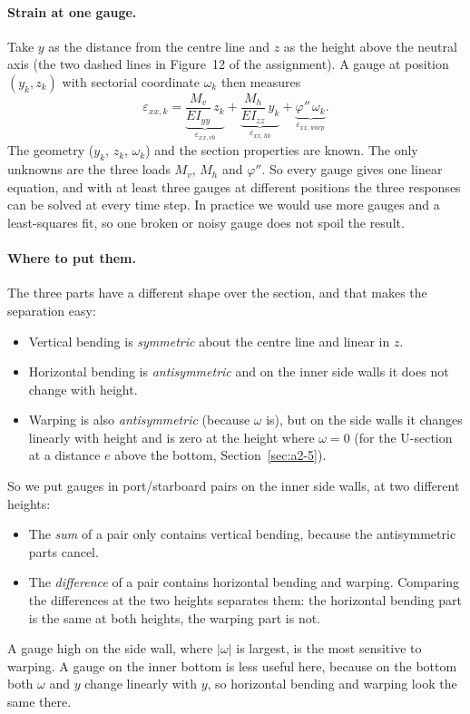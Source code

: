 \paragraph{Strain at one gauge.} Take $y$ as the distance from the centre line and $z$ as the height above the neutral axis (the two dashed lines in Figure~12 of the assignment). A gauge at position $(y_k, z_k)$ with sectorial coordinate $\omega_k$ then measures
\begin{equation}
  \varepsilon_{xx,k}
  = \underbrace{\frac{M_v}{E I_{yy}}\,z_k}_{\varepsilon_{xx,vb}}
  + \underbrace{\frac{M_h}{E I_{zz}}\,y_k}_{\varepsilon_{xx,hb}}
  + \underbrace{\varphi''\,\omega_k}_{\varepsilon_{xx,warp}} .
  \label{eq:a7-strain}
\end{equation}
The geometry ($y_k$, $z_k$, $\omega_k$) and the section properties are known. The only unknowns are the three loads $M_v$, $M_h$ and $\varphi''$. So every gauge gives one linear equation, and with at least three gauges at different positions the three responses can be solved at every time step. In practice we would use more gauges and a least-squares fit, so one broken or noisy gauge does not spoil the result.

\paragraph{Where to put them.} The three parts have a different shape over the section, and that makes the separation easy:
\begin{itemize}
  \item Vertical bending is \emph{symmetric} about the centre line and linear in $z$.
  \item Horizontal bending is \emph{antisymmetric} and on the inner side walls it does not change with height.
  \item Warping is also \emph{antisymmetric} (because $\omega$ is), but on the side walls it changes linearly with height and is zero at the height where $\omega = 0$ (for the U-section at a distance $e$ above the bottom, Section~\ref{sec:a2-5}).
\end{itemize}
So we put gauges in port/starboard pairs on the inner side walls, at two different heights:
\begin{itemize}
  \item The \emph{sum} of a pair only contains vertical bending, because the antisymmetric parts cancel.
  \item The \emph{difference} of a pair contains horizontal bending and warping. Comparing the differences at the two heights separates them: the horizontal bending part is the same at both heights, the warping part is not.
\end{itemize}
A gauge high on the side wall, where $|\omega|$ is largest, is the most sensitive to warping. A gauge on the inner bottom is less useful here, because on the bottom both $\omega$ and $y$ change linearly with $y$, so horizontal bending and warping look the same there.

